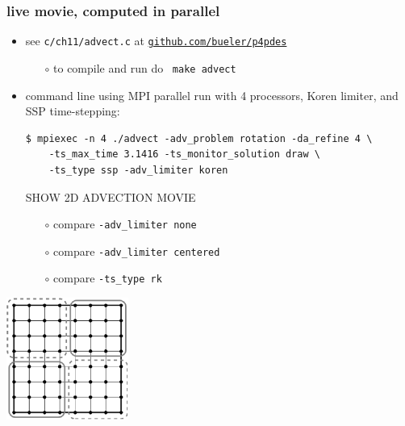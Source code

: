\documentclass[10pt,hyperref,dvipsnames]{beamer}
\begin{document}
\begin{frame}[fragile]
\frametitle{live movie, computed in parallel}

\begin{itemize}
\item see \texttt{c/ch11/advect.c} at \href{https://github.com/bueler/p4pdes}{\texttt{github.com/bueler/p4pdes}}
    \begin{itemize}
    \item[$\circ$] to compile and run do \, \texttt{make advect}
    \end{itemize}
\item command line using MPI parallel run with 4 processors, Koren limiter, and SSP time-stepping:
\begin{Verbatim}[fontsize=\small]
$ mpiexec -n 4 ./advect -adv_problem rotation -da_refine 4 \
    -ts_max_time 3.1416 -ts_monitor_solution draw \
    -ts_type ssp -adv_limiter koren
\end{Verbatim}

\vspace{10mm}
\hspace{15mm} \alert{SHOW 2D ADVECTION MOVIE}

\vspace{10mm}
    \begin{itemize}
    \item[$\circ$] compare \texttt{-adv\_limiter none}
    \item[$\circ$] compare \texttt{-adv\_limiter centered}
    \item[$\circ$] compare \texttt{-ts\_type rk}
    \end{itemize}
\end{itemize}

\vspace{-35mm}
\hfill \includegraphics[width=0.3\textwidth]{figs/buelerfourproc}
\end{frame}
\end{document}
